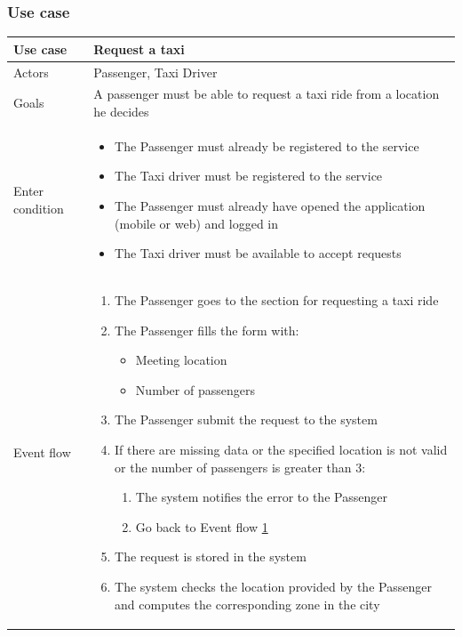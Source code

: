 \subsubsection{Use case}
\begin{center}
\begin{longtable}{| p{} | p{} |} \hline
Use case & \textbf{Request a taxi} \\ \hline 
Actors & Passenger, Taxi Driver \\ \hline
Goals & A passenger must be able to request a taxi ride from a location he decides \\ \hline
Enter condition & \begin{itemize}
					\item The Passenger must already be registered to the service
					\item The Taxi driver must be registered to the service
					\item The Passenger must already have opened the application (mobile or web) and logged in
					\item The Taxi driver must be available to accept requests
					\end{itemize} \\ \hline
Event flow & \begin{enumerate}
				\item The Passenger goes to the section for requesting a taxi ride
				\item \label{fillForm} The Passenger fills the form with:
				\begin{itemize}
					\item Meeting location
					\item Number of passengers
				\end{itemize}
				\item The Passenger submit the request to the system
				\item If there are missing data or the specified location is not valid or the number of passengers is greater than 3:
				\begin{enumerate}
					\item The system notifies the error to the Passenger
					\item Go back to Event flow \ref{fillForm}
				\end{enumerate}
				\item The request is stored in the system
				\item The system checks the location provided by the Passenger and computes the corresponding zone in the city

\end{enumerate}
\end{longtable}
\end{center}
